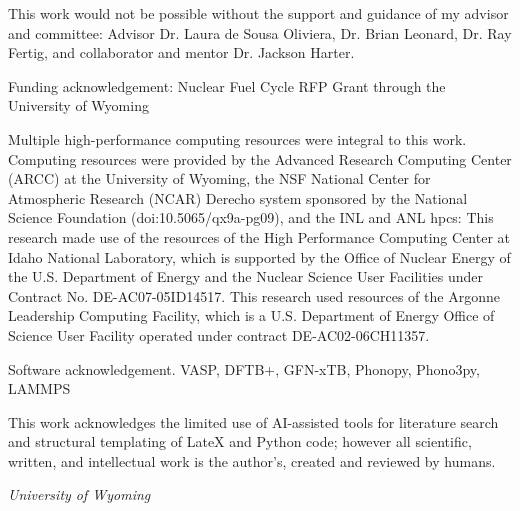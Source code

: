 \thispagestyle{plain}

\setlength{\parindent}{1.5em}


This work would not be possible without the support and guidance of my advisor and committee: Advisor Dr. Laura de Sousa Oliviera, Dr. Brian Leonard, Dr. Ray Fertig, and collaborator and mentor Dr. Jackson Harter.

Funding acknowledgement: Nuclear Fuel Cycle RFP Grant through the University of Wyoming

Multiple high-performance computing resources were integral to this work. Computing resources were provided by the Advanced Research Computing Center (ARCC) at the University of Wyoming, the NSF National Center for Atmospheric Research (NCAR) Derecho system sponsored by the National Science Foundation (doi:10.5065/qx9a-pg09), and the INL and ANL hpcs: This research made use of the resources of the High Performance Computing Center at Idaho National Laboratory, which is supported by the Office of Nuclear Energy of the U.S. Department of Energy and the Nuclear Science User Facilities under Contract No. DE-AC07-05ID14517. This research used resources of the Argonne Leadership Computing Facility, which is a U.S. Department of Energy Office of Science User Facility operated under contract DE-AC02-06CH11357. \autocite{DerechoComputingEnvironment,MedicinebowComputingEnvironment2025,BeartoothComputingEnvironment,SawtoothComputingEnvironment,AuroraComputingEnvironment}

Software acknowledgement. VASP, DFTB+, GFN-xTB, Phonopy, Phono3py, LAMMPS \autocite{kresseInitioMolecularDynamics1993,kresseInitioMolecularDynamics1994,kresseEfficiencyAbinitioTotal1996,kresseUltrasoftPseudopotentialsProjector1999,hourahine2020dftb,grimmeRobustEfficientGeneral2017,bannwarthGFN2xTBAnAccurateBroadly2019,togoFirstprinciplesPhononCalculations2023,togoImplementationStrategiesPhonon2023,togoDistributionsPhononLifetimes2015,thompsonLAMMPSFlexibleSimulation2022}

This work acknowledges the limited use of AI-assisted tools for literature search and structural templating of LateX and Python code; however all scientific, written, and intellectual work is the author's, created and reviewed by humans. %

\vspace{\baselineskip}

\begin{flushright}

    \MakeUppercase{\authorname}
    
\end{flushright}

\vspace{\baselineskip}

\textit{University of Wyoming}

\textit{\graduationmonth} \textit{\graduationyear}

\clearpage